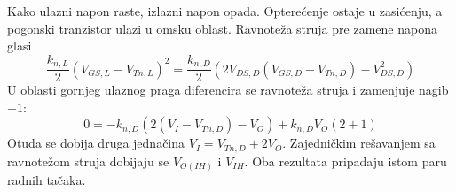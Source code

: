 Kako ulazni napon raste, izlazni napon opada. Opterećenje ostaje u zasićenju, a pogonski tranzistor ulazi u omsku oblast. Ravnoteža struja pre zamene napona glasi
\[\frac{k_{n,L}}2(V_{GS,L}-V_{Tn,L})^2=\frac{k_{n,D}}2\left(2V_{DS,D}(V_{GS,D}-V_{Tn,D})-V_{DS,D}^2\right)\]
U oblasti gornjeg ulaznog praga diferencira se ravnoteža struja i zamenjuje nagib $-1$:
\[0=-k_{n,D}\left(2(V_I-V_{Tn,D})-V_O\right)+k_{n,D}V_O(2+1)\]
Otuda se dobija druga jednačina $V_I=V_{Tn,D}+2V_O$. Zajedničkim rešavanjem sa ravnotežom struja dobijaju se $V_{O(IH)}$ i $V_{IH}$. Oba rezultata pripadaju istom paru radnih tačaka.
